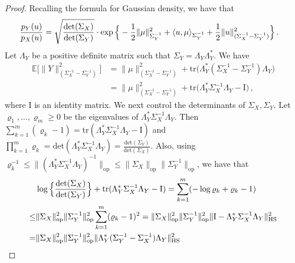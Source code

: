 \documentclass[11pt]{article}
\numberwithin{equation}{section}
\begin{document}
\begin{proof}
Recalling the formula for Gaussian density, we have that
\begin{align}\label{eq-density-ratio-expression}
     \frac{  p_{Y} (u)  }{  p_{X} (u)  } 
    &= \sqrt{\frac{\textup{det}(\Sigma_{X})} {\textup{det}(\Sigma_{Y})}} \cdot \exp \Big\{  - \frac{1}{2} \| \mu \|_{\Sigma_{Y}^{-1}}^{2} + \langle u,\mu \rangle_{\Sigma^{-1}_{Y}}  + \frac{1}{2} \| u \|^2_{ (\Sigma_{X}^{-1} - \Sigma_{Y}^{-1}) } \Big\}\,.
\end{align}
Let $\Lambda_{Y}$ be a positive definite matrix such that  $\Sigma_{Y} = \Lambda_{Y} \Lambda_{Y}^{*}$. We have 
\begin{align}\label{eq-Y-Sigma-norm}
\mathbb{E} \big[\| Y \|^2_{(\Sigma_{X}^{-1} - \Sigma_{Y}^{-1})} \big] &= \| \mu \|^2_{(\Sigma_X^{-1} - \Sigma_Y^{-1})} + \mathrm{tr} \big( \Lambda_{Y}^{*} ( \Sigma_{X}^{-1} - \Sigma_{Y}^{-1} ) \Lambda_{Y} \big) \nonumber \\
& = \| \mu \|^2_{(\Sigma_X^{-1} - \Sigma_Y^{-1})} + \mathrm{tr} \big( \Lambda_{Y}^{*}  \Sigma_{X}^{-1} \Lambda_{Y} - \mathrm{I} \big)\,,
\end{align}
where $\mathrm{I}$ is an identity matrix.
We next control the determinants of $\Sigma_X, \Sigma_Y$. Let $\varrho_{1}, \ldots, \varrho_{m} \geq 0$ be the eigenvalues of $ \Lambda_{Y}^{*} \Sigma_{X}^{-1} \Lambda_{Y} $. Then $\sum_{k=1}^{m} (\varrho_{k}-1) = \mathrm{tr}( \Lambda_{Y}^{*} \Sigma_{X}^{-1} \Lambda_{Y} - \mathrm{I} ) $ and $\prod_{k=1}^{m} \varrho_k = \mathrm{det} (\Lambda_{Y}^{*} \Sigma_{X}^{-1} \Lambda_{Y}) = \frac{\mathrm{det}(\Sigma_Y)}{\mathrm{det}(\Sigma_{X})}$. Also, using $ \varrho_k^{-1} \leq \| (\Lambda_{Y}^{*} \Sigma_{X}^{-1} \Lambda_{Y})^{-1} \|_{\mathrm{op}} \leq \| \Sigma_{X} \|_{\mathrm{op}} \| \Sigma_{Y}^{-1} \|_{\mathrm{op}}$, we have that
\begin{align*}
    & \log \Big\{ \frac{\textup{det}(\Sigma_{X})} {\textup{det}(\Sigma_{Y})} \Big\} + \mathrm{tr}( \Lambda_{Y}^{*} \Sigma_{X}^{-1} \Lambda_{Y} - \mathrm{I} ) = \sum_{k=1}^{m} ( - \log \varrho_{k} + \varrho_{k}-1 ) \\
    \leq & \| \Sigma_{X} \|_{\mathrm{op}}^{2} \| \Sigma_{Y}^{-1} \|_{\mathrm{op}}^{2} \sum_{k=1}^{m} (\varrho_k-1)^2 = \| \Sigma_{X} \|_{\mathrm{op}}^{2} \| \Sigma_{Y}^{-1} \|_{\mathrm{op}}^{2} \| \mathrm{I} - \Lambda_{Y}^{*} \Sigma_{X}^{-1} \Lambda_{Y}  \|_{\mathrm{HS}}^2  \\
    = & \| \Sigma_{X} \|_{\mathrm{op}}^{2} \| \Sigma_{Y}^{-1} \|_{\mathrm{op}}^{2} \| \Lambda_{Y}^{*} (\Sigma_{Y}^{-1} - \Sigma_{X}^{-1}) \Lambda_{Y} \|_{\mathrm{HS}}^2 

\end{align*}
\end{proof}
\end{document}
